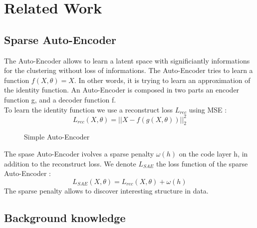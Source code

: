 \section{Related Work}\label{sec:related}

\subsection{Sparse Auto-Encoder}

The Auto-Encoder allows to learn a latent space with significiantly informations
for the clustering without loss of informations. The Auto-Encoder tries to learn
a function $f(X, \theta) = X$. In other words, it is trying to learn an
approximation of the identity function. An Auto-Encoder is composed in two
parts an encoder function g, and a decoder function f.\\
To learn the identity function we use a reconstruct loss $L_{rec}$ using MSE :
\begin{equation*}
  L_{rec}(X, \theta) = || X - f(g(X, \theta)) ||_2^2 
\end{equation*}

\begin{figure}[!h]
  \centering
  
  \caption{Simple Auto-Encoder}
  \label{fig:AE}
\end{figure}
The spase Auto-Encoder ivolves a sparse penalty $\omega(h)$ on the code layer h,
in addition to the reconstruct loss. We  denote $L_{SAE}$ the loss function of
the sparse Auto-Encoder :
\begin{equation*}
  L_{SAE}(X, \theta) = L_{rec}(X, \theta) + \omega(h)
\end{equation*}
The sparse penalty allows to discover interesting structure in data.

\subsection{Background knowledge}

